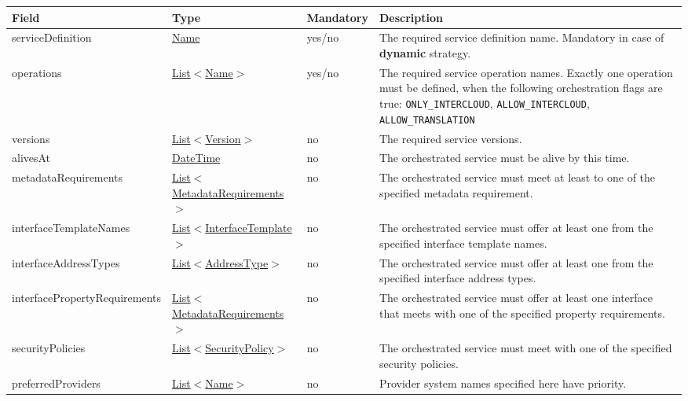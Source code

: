 \documentclass[a4paper]{arrowhead}
\newcommand{\pref}[1]{{\textcolor{ArrowheadGrey}{\hyperref[sec:model:primitives:#1]{#1}}}}
\begin{document}
\begin{table}[ht!]
\begin{tabularx}{\textwidth}{| p{4.8cm} | p{4.7cm} | p{2cm} | X |} \hline
\rowcolor{gray!33} Field & Type & Mandatory & Description \\ \hline
serviceDefinition & \pref{Name} & yes/no & The required service definition name. Mandatory in case of \textbf{dynamic} strategy. \\ \hline
operations & \pref{List}$<$\pref{Name}$>$ & yes/no & The required service operation names. \newline 
Exactly one operation must be defined, when the following orchestration flags are true: \newline \texttt{ONLY\_INTERCLOUD}, \texttt{ALLOW\_INTERCLOUD}, \texttt{ALLOW\_TRANSLATION} \\ \hline
versions & \pref{List}$<$\pref{Version}$>$ & no & The required service versions. \\ \hline 
alivesAt & \pref{DateTime} & no & The orchestrated service must be alive by this time. \\ \hline
metadataRequirements & \pref{List}$<$\hyperref[sec:model:MetadataRequirements]{MetadataRequirements}$>$ & no & The orchestrated service must meet at least to one of the specified metadata requirement. \\ \hline
interfaceTemplateNames & \pref{List}$<$\pref{InterfaceTemplate}$>$ & no & The orchestrated service must offer at least one from the specified interface template names. \\ \hline 
interfaceAddressTypes & \pref{List}$<$\pref{AddressType}$>$ & no & The orchestrated service must offer at least one from the specified interface address types. \\ \hline
interfacePropertyRequirements & \pref{List}$<$\hyperref[sec:model:MetadataRequirements]{MetadataRequirements}$>$ & no & The orchestrated service must offer at least one interface that meets with one of the specified property requirements. \\ \hline
securityPolicies & \pref{List}$<$\pref{SecurityPolicy}$>$ & no & The orchestrated service must meet with one of the specified security policies. \\ \hline
preferredProviders & \pref{List}$<$\pref{Name}$>$ & no & Provider system names specified here have priority. \\ \hline
\end{tabularx}
\end{table}
\end{document}
